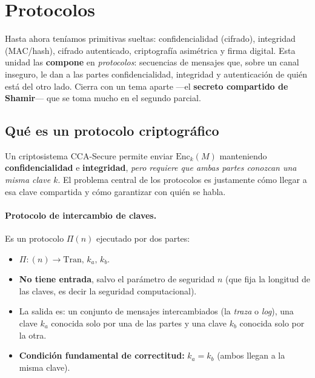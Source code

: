 \documentclass[../main.tex]{subfiles}
\begin{document}
\section{Protocolos}

Hasta ahora teníamos primitivas sueltas: confidencialidad (cifrado), integridad
(MAC/hash), cifrado autenticado, criptografía asimétrica y firma digital. Esta
unidad las \textbf{compone} en \emph{protocolos}: secuencias de mensajes que, sobre
un canal inseguro, le dan a las partes confidencialidad, integridad y autenticación
de quién está del otro lado. Cierra con un tema aparte —el \textbf{secreto
compartido de Shamir}— que se toma mucho en el segundo parcial.


\subsection{Qué es un protocolo criptográfico}

Un criptosistema CCA-Secure permite enviar $\mathrm{Enc}_k(M)$ manteniendo
\textbf{confidencialidad} e \textbf{integridad}, \emph{pero requiere que ambas
partes conozcan una misma clave $k$}. El problema central de los protocolos es
justamente cómo llegar a esa clave compartida y cómo garantizar con quién se habla.

\paragraph{Protocolo de intercambio de claves.} Es un protocolo $\Pi(n)$ ejecutado
por dos partes:
\begin{itemize}[leftmargin=1.4em]
  \item $\Pi: (n) \to \mathrm{Tran},\, k_a,\, k_b$.
  \item \textbf{No tiene entrada}, salvo el parámetro de seguridad $n$ (que fija la
  longitud de las claves, es decir la seguridad computacional).
  \item La salida es: un conjunto de mensajes intercambiados (la \emph{traza} o
  \emph{log}), una clave $k_a$ conocida solo por una de las partes y una clave $k_b$
  conocida solo por la otra.
  \item \textbf{Condición fundamental de correctitud:} $k_a = k_b$ (ambos llegan a
  la misma clave).
\end{itemize}
\end{document}
